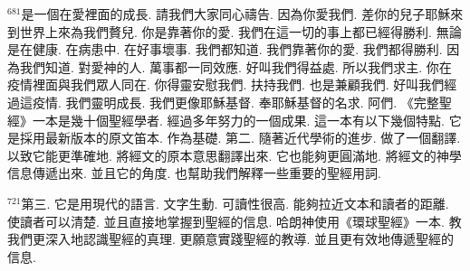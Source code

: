 \documentclass{book}
\begin{document}
$^{681}$是一個在愛裡面的成長.
請我們大家同心禱告.
因為你愛我們.
差你的兒子耶穌來到世界上來為我們贅兒.
你是靠著你的愛.
我們在這一切的事上都已經得勝利.
無論是在健康.
在病患中.
在好事壞事.
我們都知道.
我們靠著你的愛.
我們都得勝利.
因為我們知道.
對愛神的人.
萬事都一同效應.
好叫我們得益處.
所以我們求主.
你在疫情裡面與我們眾人同在.
你得靈安慰我們.
扶持我們.
也是兼顧我們.
好叫我們經過這疫情.
我們靈明成長.
我們更像耶穌基督.
奉耶穌基督的名求.
阿們.
《完整聖經》一本是幾十個聖經學者.
經過多年努力的一個成果.
這一本有以下幾個特點.
它是採用最新版本的原文笛本.
作為基礎.
第二.
隨著近代學術的進步.
做了一個翻譯.
以致它能更準確地.
將經文的原本意思翻譯出來.
它也能夠更圓滿地.
將經文的神學信息傳遞出來.
並且它的角度.
也幫助我們解釋一些重要的聖經用詞.

$^{721}$第三.
它是用現代的語言.
文字生動.
可讀性很高.
能夠拉近文本和讀者的距離.
使讀者可以清楚.
並且直接地掌握到聖經的信息.
哈朗神使用《環球聖經》一本.
教我們更深入地認識聖經的真理.
更願意實踐聖經的教導.
並且更有效地傳遞聖經的信息.
\newpage
\end{document}
